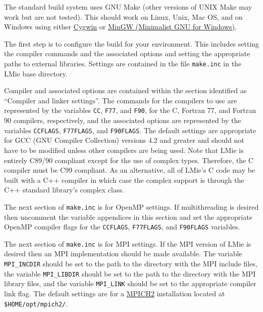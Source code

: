 \label{building_and_using_lmie_building_lmie_gnu_make}

The standard build system uses GNU Make (other versions of UNIX Make may work but are not tested).  This should work on Linux, Unix, Mac OS, and on Windows using either \href{http://www.cygwin.com/}{Cygwin} or \href{http://www.mingw.org/}{MinGW (Minimalist GNU for Windows)}.

The first step is to configure the build for your environment.  This includes setting the compiler commands and the associated options and setting the appropriate paths to external libraries.  Settings are contained in the file \texttt{make.inc} in the LMie base directory.

Compiler and associated options are contained within the section identified as ``Compiler and linker settings''.  The commands for the compilers to use are represented by the variables \texttt{CC}, \texttt{F77}, and \texttt{F90}, for the C, Fortran 77, and Fortran 90 compilers, respectively, and the associated options are represented by the variables \texttt{CCFLAGS}, \texttt{F77FLAGS}, and \texttt{F90FLAGS}.  The default settings are appropriate for GCC (GNU Compiler Collection) versions 4.2 and greater and should not have to be modified unless other compilers are being used.  Note that LMie is entirely C89/90 compliant except for the use of complex types.  Therefore, the C compiler must be C99 compliant.  As an alternative, all of LMie's C code may be built with a C++ compiler in which case the complex support is through the C++ standard library's complex class.

The next section of \texttt{make.inc} is for OpenMP settings.  If multithreading is desired then uncomment the variable appendices in this section and set the appropriate OpenMP compiler flags for the \texttt{CCFLAGS}, \texttt{F77FLAGS}, and \texttt{F90FLAGS} variables.

The next section of \texttt{make.inc} is for MPI settings.  If the MPI version of LMie is desired then an MPI implementation should be made available.  The variable \texttt{MPI\_INCDIR} should be set to the path to the directory with the MPI include files, the variable \texttt{MPI\_LIBDIR} should be set to the path to the directory with the MPI library files, and the variable \texttt{MPI\_LINK} should be set to the appropriate compiler link flag.  The default settings are for a \href{http://www.mcs.anl.gov/research/projects/mpich2/}{MPICH2} installation located at \texttt{\${HOME}/opt/mpich2/}.

